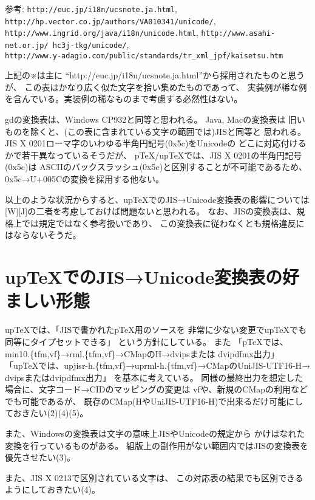 \documentclass{ujarticle}
\begin{document}
参考: {\tt http://euc.jp/i18n/ucsnote.ja.html}, 
{\tt http://hp.vector.co.jp/authors/VA010341/unicode/}, \\
{\tt http://www.ingrid.org/java/i18n/unicode.html}, 
{\tt http://www.asahi-net.or.jp/~hc3j-tkg/unicode/}, \\
{\tt http://www.y-adagio.com/public/standards/tr\_xml\_jpf/kaisetsu.htm}

\vspace{3mm}
\baselineskip15pt

上記の※は主に
``http://euc.jp/i18n/ucsnote.ja.html''から採用されたものと思うが、
この表はかなり広く似た文字を拾い集めたものであって、
実装例が稀な例を含んでいる。実装例の稀なものまで考慮する必然性はない。

gdの変換表は、Windows CP932と同等と思われる。
Java, Macの変換表は
旧いものを除くと、(この表に含まれている文字の範囲では)JISと同等と
思われる。JIS X 0201ローマ字のいわゆる半角円記号(0x5c)をUnicodeの
どこに対応付けるかで若干異なっているそうだが、
pTeX/upTeXでは、JIS X 0201の半角円記号(0x5c)は
ASCIIのバックスラッシュ(0x5c)と区別することが不可能であるため、
0x5c→U+005Cの変換を採用する他ない。

以上のような状況からすると、upTeXでのJIS→Unicode変換表の影響については
[W][J]の二者を考慮しておけば問題ないと思われる。
なお、JISの変換表は、規格上では規定ではなく参考扱いであり、
この変換表に従わなくとも規格違反にはならないそうだ。


\section{upTeXでのJIS→Unicode変換表の好ましい形態}
upTeXでは、「JISで書かれたpTeX用のソースを
非常に少ない変更でupTeXでも同等にタイプセットできる」
という方針にしている。
また
「pTeXでは、min10.\{tfm,vf\}→rml.\{tfm,vf\}→CMapのH→dvipsまたは
dvipdfmx出力」
「upTeXでは、upjisr-h.\{tfm,vf\}→uprml-h.\{tfm,vf\}→CMapのUniJIS-UTF16-H→
dvipsまたはdvipdfmx出力」
を基本に考えている。
同様の最終出力を想定した場合に、文字コード→CIDのマッピングの変更は
vfや、新規のCMapの利用などでも可能であるが、
既存のCMap(HやUniJIS-UTF16-H)で出来るだけ可能にしておきたい(2)(4)(5)。

また、Windowsの変換表は文字の意味上JISやUnicodeの規定から
かけはなれた変換を行っているものがある。
組版上の副作用がない範囲内ではJISの変換表を優先させたい(3)。

また、JIS X 0213で区別されている文字は、
この対応表の結果でも区別できるようにしておきたい(4)。
\end{document}
